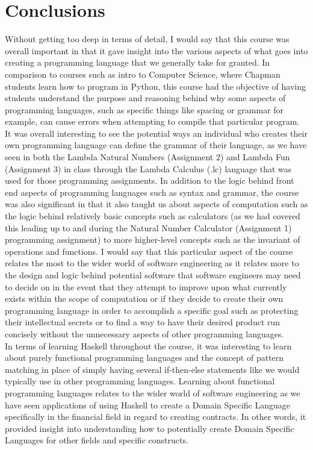\documentclass{article}
\theoremstyle{theorem}
\theoremstyle{definition}
\theoremstyle{remark}
\begin{document}
\section{Conclusions}\label{Conclusions}
\indent Without getting too deep in terms of detail, I would say that this course was overall important in that it gave insight into the various aspects of what goes into creating a programming language that we generally take for granted. In comparison to courses such as intro to Computer Science, where Chapman students learn how to program in Python, this course had the objective of having students understand the purpose and reasoning behind why some aspects of programming languages, such as specific things like spacing or grammar for example, can cause errors when attempting to compile that particular program. It was overall interesting to see the potential ways an individual who creates their own programming language can define the grammar of their language, as we have seen in both the Lambda Natural Numbers (Assignment 2) and Lambda Fun (Assignment 3) in class through the Lambda Calculus (.lc)  language that was used for those programming assignments. In addition to the logic behind front end aspects of programming languages such as syntax and grammar, the course was also significant in that it also taught us about aspects of computation such as the logic behind relatively basic concepts such as calculators (as we had covered this leading up to and during the Natural Number Calculator (Assignment 1) programming assignment) to more higher-level concepts such as the invariant of operations and functions. I would say that this particular aspect of the course relates the most to the wider world of software engineering as it relates more to the design and logic behind potential software that software engineers may need to decide on in the event that they attempt to improve upon what currently exists within the scope of computation or if they decide to create their own programming language in order to accomplish a specific goal such as protecting their intellectual secrets or to find a way to have their desired product run concisely without the unnecessary aspects of other programming languages.
\\
\indent In terms of learning Haskell throughout the course, it was interesting to learn about purely functional programming languages and the concept of pattern matching in place of simply having several if-then-else statements like we would typically use in other programming languages. Learning about functional programming languages relates to the wider world of software engineering as we have seen applications of using Haskell to create a Domain Specific Language specifically in the financial field in regard to creating contracts. In other words, it provided insight into understanding how to potentially create Domain Specific Languages for other fields and specific constructs.
\end{document}

